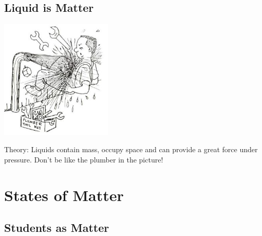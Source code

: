 \begin{multicols}{2}
\subsection{Liquid is Matter}

\begin{center}
\includegraphics[width=0.4\textwidth]{./img/source/liquid-matter.jpg}
\end{center}

\begin{description*}
\item[Theory:]{Liquids contain mass, occupy space and can provide a great force under pressure. Don't be like the plumber in the picture!}
\end{description*}


\section*{States of Matter}

\subsection{Students as Matter}


\end{multicols}
